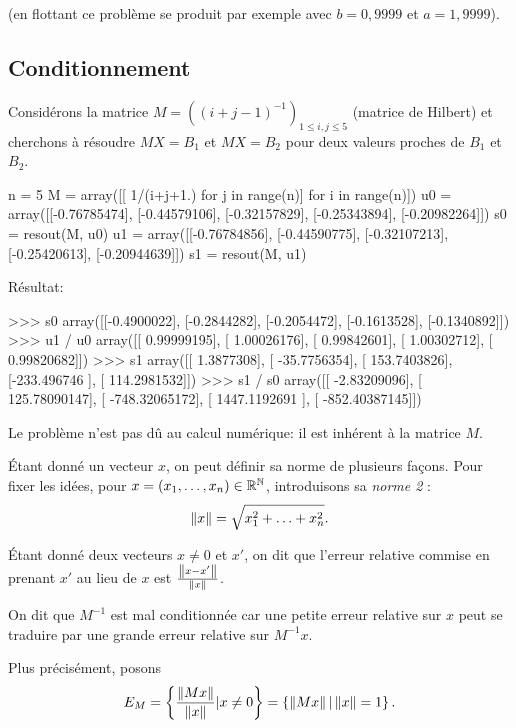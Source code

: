 (en flottant ce problème se produit par exemple avec $b=0,9999$ et
$a=1,9999$).

\subsection{Conditionnement}

Considérons la matrice $M = ((i+j-1)^{-1})_{1\leq i,j\leq 5}$ (matrice
de Hilbert) et
cherchons à résoudre $MX = B_{1}$ et $MX = B_{2}$ pour deux valeurs
proches de $B_{1}$ et $B_{2}$.
\begin{pyverbatim}
n = 5
M = array([[ 1/(i+j+1.) for j in range(n)] for i in range(n)])
u0 = array([[-0.76785474],
       [-0.44579106],
       [-0.32157829],
       [-0.25343894],
       [-0.20982264]])
s0 = resout(M, u0)
u1 = array([[-0.76784856],
       [-0.44590775],
       [-0.32107213],
       [-0.25420613],
       [-0.20944639]])
s1 = resout(M, u1)
\end{pyverbatim}

Résultat:
\begin{pyverbatim}
>>> s0
array([[-0.4900022],
       [-0.2844282],
       [-0.2054472],
       [-0.1613528],
       [-0.1340892]])
>>> u1 / u0
array([[ 0.99999195],
       [ 1.00026176],
       [ 0.99842601],
       [ 1.00302712],
       [ 0.99820682]])
>>> s1
array([[   1.3877308],
       [ -35.7756354],
       [ 153.7403826],
       [-233.496746 ],
       [ 114.2981532]])
>>> s1 / s0
array([[   -2.83209096],
       [  125.78090147],
       [ -748.32065172],
       [ 1447.1192691 ],
       [ -852.40387145]])
\end{pyverbatim}

Le problème  n'est pas dû  au calcul numérique:  il est inhérent  à la
matrice $M$.

Étant donné un vecteur $x$, on peut définir sa norme de
plusieurs façons. Pour fixer les idées, pour $x = (x_{1}, \ldots,
x_{n})\in \mathbb{R}^{\mathbb{N}}$, introduisons sa \emph{norme 2} :
\begin{equation*}
 \left\Vert {x}\right\Vert  = \sqrt{x_{1}^{2}+\ldots+x_{n}^{2}}.
\end{equation*}


Étant donné deux vecteurs $x\neq 0$ et $x'$, on dit que l'erreur
relative commise en prenant $x'$ au lieu de $x$ est
$\frac{\left\Vert {x-x'}\right\Vert}{\left\Vert {x}\right\Vert}$.

On dit que $M^{-1}$ est mal conditionnée car une petite erreur relative sur
$x$ peut se traduire par une grande erreur relative sur $M^{-1}x$.

Plus précisément, posons
\begin{equation*}
  E_{M} = \left\{\frac{\left\Vert {Mx}\right\Vert}{\left\Vert {x}\right\Vert} | x\neq 0\right\} = \left\{\left\Vert {Mx}\right\Vert |
    \left\Vert {x}\right\Vert = 1\right\}.
\end{equation*}

